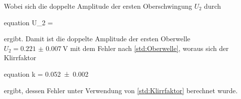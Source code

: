 	Wobei sich die doppelte Amplitude der ersten Oberschwingung $U_{2}$ durch
	\begin{empheq}{equation}
		U_{2} = \footnotemark
		\label{eq:Oberwelle}
	\end{empheq}
	
	ergibt. Damit ist die doppelte Amplitude der ersten Oberwelle $U_{2} = \SI{0.221(7)}{\volt}$ mit dem Fehler nach \cref{std:Oberwelle},
	woraus sich der Klirrfaktor
	\begin{empheq}{equation}
		\label{eq:Klirrfaktor_Wert}
		k = \num{0.052(2)}
	\end{empheq}	
	ergibt, dessen Fehler unter Verwendung von \cref{std:Klirrfaktor} berechnet wurde.